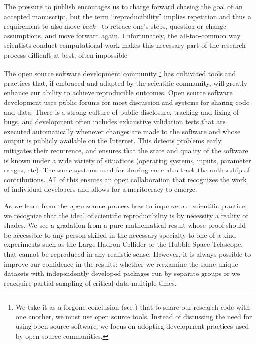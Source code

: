\documentclass[ChapterTOCs,krantz2]{krantz} %
\begin{document}
The pressure to publish encourages us to charge forward chasing the goal of an
accepted manuscript, but the term ``reproducibility'' implies repetition and
thus a requirement to also move \emph{back}---to retrace one's steps, question
or change assumptions, and move forward again. Unfortunately, the
all-too-common way scientists conduct computational work makes this necessary
part of the research process difficult at best, often impossible.

The open source software development community%
\footnote{We take
  it as a forgone conclusion (see \cite{joyner2007open}) that to share our research
  code with one another, we must use
  open source tools.  Instead of discussing the need for using open source
  software, we focus on adopting development practices used by open source
  communities.}
has cultivated tools and practices that, if embraced and adapted by the
scientific community, will greatly enhance our ability to achieve reproducible
outcomes.  Open source software development uses public forums for most
discussion and systems for sharing code and data. There is a strong culture of
public disclosure, tracking and fixing of bugs, and development often includes
exhaustive validation tests that are executed automatically whenever changes
are made to the software and whose output is publicly available on the
Internet. This detects problems early, mitigates their recurrence, and ensures
that the state and quality of the software is known under a wide variety of
situations (operating systems, inputs, parameter ranges, etc).  The same
systems used for sharing code also track the authorship of contributions. All
of this ensures an open collaboration that recognizes the work of individual
developers and allows for a meritocracy to emerge.

As we learn from the open source process how to improve our scientific
practice, we recognize that the ideal of scientific reproducibility is by
necessity a reality of shades. We see a gradation from a pure mathematical
result whose proof should be accessible to any person skilled in the necessary
specialty to one-of-a-kind experiments such as the Large Hadron Collider or the
Hubble Space Telescope, that cannot be reproduced in any realistic sense.
However, it is always possible to improve our confidence in the results:
whether we reexamine the same unique datasets with independently developed
packages run by separate groups or we reacquire partial sampling of critical
data multiple times.
\end{document}
